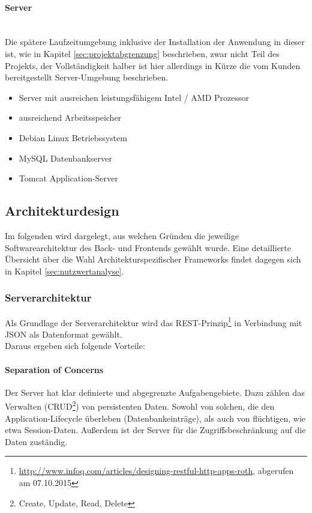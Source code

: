 \documentclass[12pt, xcolor=dvipsnames]{scrartcl}
\begin{document}
\paragraph{Server} ~\\
\label{par:zielplattform_server}%
Die spätere Laufzeitumgebung inklusive der Installation der Anwendung in dieser ist, wie in Kapitel \ref{sec:projektabgrenzung} beschrieben, zwar nicht Teil des Projekts, der Vollständigkeit halber ist hier allerdings in Kürze die vom Kunden bereitgestellt Server-Umgebung beschrieben.
\begin{itemize}
	\item Server mit ausreichen leistungsfähigem Intel / AMD Prozessor
	\item ausreichend Arbeitsspeicher
	\item Debian Linux Betriebssystem
	\item MySQL Datenbankserver
	\item Tomcat Application-Server	
\end{itemize}


\subsection{Architekturdesign}

Im folgenden wird dargelegt, aus welchen Gründen die jeweilige Softwarearchitektur des Back- und Frontends gewählt wurde. Eine detaillierte Übersicht über die Wahl Architekturspezifischer Frameworks findet dagegen sich in Kapitel \ref{sec:nutzwertanalyse}. \\

\subsubsection{Serverarchitektur}

Als Grundlage der Serverarchitektur wird das
REST-Prinzip\footnote{\url{http://www.infoq.com/articles/designing-restful-http-apps-roth}, abgerufen am 07.10.2015} 
in Verbindung mit JSON als Datenformat gewählt. \\

Daraus ergeben sich folgende Vorteile:

\paragraph{Separation of Concerns}
Der Server hat klar definierte und abgegrenzte Aufgabengebiete. Dazu zählen das Verwalten
(CRUD\footnote{Create, Update, Read, Delete}) von persistenten Daten. Sowohl von solchen, die den Application-Lifecycle überleben (Datenbankeinträge), als auch von flüchtigen, wie etwa Session-Daten. Außerdem ist der Server für die Zugriffsbeschränkung auf die Daten zuständig.
\end{document}
